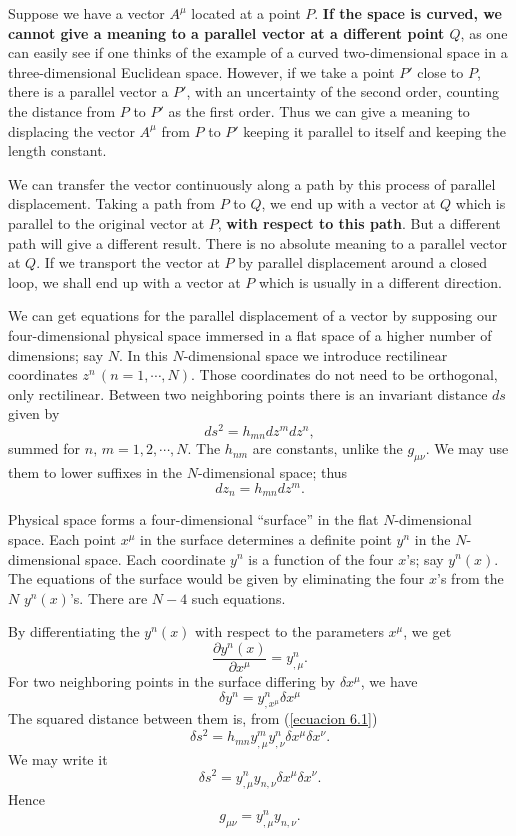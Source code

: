 
Suppose we have a vector $A^\mu$ located at a point $P$. \textbf{If the space is curved, we cannot give a meaning to a parallel vector at a different point $Q$}, as one can easily see if one thinks of the example of a curved two-dimensional space in a three-dimensional Euclidean space. However, if we take a point $P'$ close to $P$, there is a parallel vector a $P'$, with an uncertainty of the second order, counting the distance from $P$ to $P'$ as the first order. Thus we can give a meaning to displacing the vector $A^\mu$ from $P$ to $P'$ keeping it parallel to itself and keeping the length constant.

We can transfer the vector continuously along a path by this process of parallel displacement. Taking a path from $P$ to $Q$, we end up with a vector at $Q$ which is parallel to the original vector at $P$, \textbf{with respect to this path}. But a different path will give a different result. There is no absolute meaning to a parallel vector at $Q$. If we transport the vector at $P$ by parallel displacement around a closed loop, we shall end up with a vector at $P$ which is usually in a different direction.

We can get equations for the parallel displacement of a vector by supposing our four-dimensional physical space immersed in a flat space of a higher number of dimensions; say $N$. In this $N$-dimensional space we introduce rectilinear coordinates $z^n\,(n=1,\cdots, N)$. Those coordinates do not need to be orthogonal, only rectilinear. Between two neighboring points there is an invariant distance $ds$ given by 
\begin{equation}
 \label{ecuacion 6.1}
 ds^2 = h_{mn} dz^m dz^n ,
\end{equation}
summed for $n,\,m = 1,2,\cdots, N$. The $h_{nm}$ are constants, unlike the $g_{\mu\nu}$. We may use them to lower suffixes in the $N$-dimensional space; thus
\[
 dz_n = h_{mn} dz^m.
\]

Physical space forms a four-dimensional ``surface'' in the flat $N$-dimensional space. Each point $x^\mu$ in the surface determines a definite point $y^n$ in the $N$-dimensional space. Each coordinate $y^n$ is a function of the four $x$'s; say $y^n(x)$. The equations of the surface would be given by eliminating the four $x$'s from the $N$ $y^n(x)$'s. There are $N-4$ such equations.

By differentiating the $y^n(x)$ with respect to the parameters $x^\mu$, we get
\[
 \frac{\partial y^n(x)}{\partial x^\mu} = y^n_{,\mu}.
\]
For two neighboring points in the surface differing by $\delta x^\mu$, we have
\begin{equation}
 \label{ecuacion 6.2}
 \delta y^n = y^n_{,x^\mu} \delta x^\mu
\end{equation}
The squared distance between them is, from (\ref{ecuacion 6.1})
\[
 \delta s^2 = h_{mn}  y^m_{,\mu}  y^n_{,\nu} \delta x^\mu \delta x^\nu.
\]
We may write it 
\[
 \delta s^2 = y^n_{,\mu} y_{n,\nu} \delta x^\mu \delta x^\nu.
\]
Hence
\begin{equation}
 \label{ecuacion 6.3}
 g_{\mu\nu} = y^n_{,\mu} y_{n,\nu}.
\end{equation}

